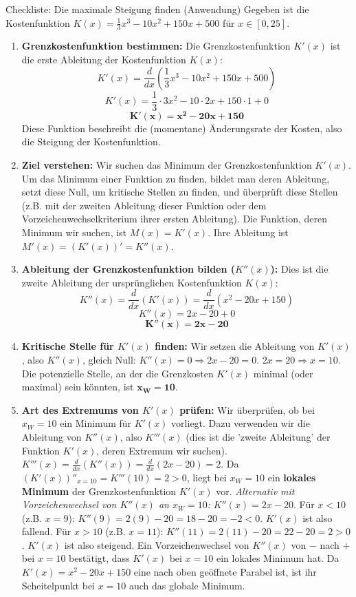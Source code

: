 \begin{loesungsumgebung}{Checkliste: Die maximale Steigung finden (Anwendung)}
Gegeben ist die Kostenfunktion $K(x) = \frac{1}{3}x^3 - 10x^2 + 150x + 500$ für $x \in [0, 25]$.

\begin{enumerate}[label=(\alph*)]
    \item \textbf{Grenzkostenfunktion bestimmen:}
    Die Grenzkostenfunktion $K'(x)$ ist die erste Ableitung der Kostenfunktion $K(x)$:
    $$ K'(x) = \frac{d}{dx}\left(\frac{1}{3}x^3 - 10x^2 + 150x + 500\right) $$
    $$ K'(x) = \frac{1}{3} \cdot 3x^2 - 10 \cdot 2x + 150 \cdot 1 + 0 $$
    $$ \mathbf{K'(x) = x^2 - 20x + 150} $$
    Diese Funktion beschreibt die (momentane) Änderungsrate der Kosten, also die Steigung der Kostenfunktion.

    \item \textbf{Ziel verstehen:}
    Wir suchen das Minimum der Grenzkostenfunktion $K'(x)$. Um das Minimum einer Funktion zu finden, bildet man deren Ableitung, setzt diese Null, um kritische Stellen zu finden, und überprüft diese Stellen (z.B. mit der zweiten Ableitung dieser Funktion oder dem Vorzeichenwechselkriterium ihrer ersten Ableitung).
    Die Funktion, deren Minimum wir suchen, ist $M(x) = K'(x)$. Ihre Ableitung ist $M'(x) = (K'(x))' = K''(x)$.

    \item \textbf{Ableitung der Grenzkostenfunktion bilden ($K''(x)$):}
    Dies ist die zweite Ableitung der ursprünglichen Kostenfunktion $K(x)$:
    $$ K''(x) = \frac{d}{dx}(K'(x)) = \frac{d}{dx}(x^2 - 20x + 150) $$
    $$ K''(x) = 2x - 20 + 0 $$
    $$ \mathbf{K''(x) = 2x - 20} $$

    \item \textbf{Kritische Stelle für $K'(x)$ finden:}
    Wir setzen die Ableitung von $K'(x)$, also $K''(x)$, gleich Null:
    $K''(x) = 0 \Rightarrow 2x - 20 = 0$.
    $2x = 20 \Rightarrow x = 10$.
    Die potenzielle Stelle, an der die Grenzkosten $K'(x)$ minimal (oder maximal) sein könnten, ist $\mathbf{x_W = 10}$.

    \item \textbf{Art des Extremums von $K'(x)$ prüfen:}
    Wir überprüfen, ob bei $x_W=10$ ein Minimum für $K'(x)$ vorliegt. Dazu verwenden wir die Ableitung von $K''(x)$, also $K'''(x)$ (dies ist die 'zweite Ableitung' der Funktion $K'(x)$, deren Extremum wir suchen).
    $K'''(x) = \frac{d}{dx}(K''(x)) = \frac{d}{dx}(2x - 20) = 2$.
    Da $(K'(x))''_{x=10} = K'''(10) = 2 > 0$, liegt bei $x_W=10$ ein \textbf{lokales Minimum} der Grenzkostenfunktion $K'(x)$ vor.
    \textit{Alternativ mit Vorzeichenwechsel von $K''(x)$ an $x_W=10$:}
    $K''(x) = 2x-20$.
    Für $x < 10$ (z.B. $x=9$): $K''(9) = 2(9)-20 = 18-20 = -2 < 0$. $K'(x)$ ist also fallend.
    Für $x > 10$ (z.B. $x=11$): $K''(11) = 2(11)-20 = 22-20 = 2 > 0$. $K'(x)$ ist also steigend.
    Ein Vorzeichenwechsel von $K''(x)$ von $-$ nach $+$ bei $x=10$ bestätigt, dass $K'(x)$ bei $x=10$ ein lokales Minimum hat.
    Da $K'(x) = x^2 - 20x + 150$ eine nach oben geöffnete Parabel ist, ist ihr Scheitelpunkt bei $x=10$ auch das globale Minimum.


\end{enumerate}
\end{loesungsumgebung}
